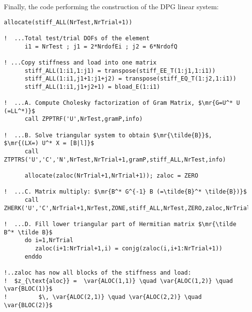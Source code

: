 Finally, the code performing the construction of the DPG linear system:
\begin{lstlisting}[mathescape,caption=\file{MAXWELL/ULTRAWEAK\_DPG/}\routine{elem\_maxwell}: constructing DPG linear system.]
      allocate(stiff_ALL(NrTest,NrTrial+1))

!  ...Total test/trial DOFs of the element
      i1 = NrTest ; j1 = 2*NrdofEi ; j2 = 6*NrdofQ

! ...Copy stiffness and load into one matrix
      stiff_ALL(1:i1,1:j1) = transpose(stiff_EE_T(1:j1,1:i1))
      stiff_ALL(1:i1,j1+1:j1+j2) = transpose(stiff_EQ_T(1:j2,1:i1))
      stiff_ALL(1:i1,j1+j2+1) = bload_E(1:i1)

!  ...A. Compute Cholesky factorization of Gram Matrix, $\mr{G=U^* U (=LL^*)}$
      call ZPPTRF('U',NrTest,gramP,info)

!  ...B. Solve triangular system to obtain $\mr{\tilde{B}}$, $\mr{(LX=) U^* X = [B|l]}$
      call ZTPTRS('U','C','N',NrTest,NrTrial+1,gramP,stiff_ALL,NrTest,info)

      allocate(zaloc(NrTrial+1,NrTrial+1)); zaloc = ZERO

!  ...C. Matrix multiply: $\mr{B^* G^{-1} B (=\tilde{B}^* \tilde{B})}$
      call ZHERK('U','C',NrTrial+1,NrTest,ZONE,stiff_ALL,NrTest,ZERO,zaloc,NrTrial+1)

!  ...D. Fill lower triangular part of Hermitian matrix $\mr{\tilde B^* \tilde B}$
      do i=1,NrTrial
         zaloc(i+1:NrTrial+1,i) = conjg(zaloc(i,i+1:NrTrial+1))
      enddo

!..zaloc has now all blocks of the stiffness and load:
!  $z_{\text{aloc}} =  \var{ALOC(1,1)} \quad \var{ALOC(1,2)} \quad \var{BLOC(1)}$
!         $\, \var{ALOC(2,1)} \quad \var{ALOC(2,2)} \quad \var{BLOC(2)}$
\end{lstlisting}




